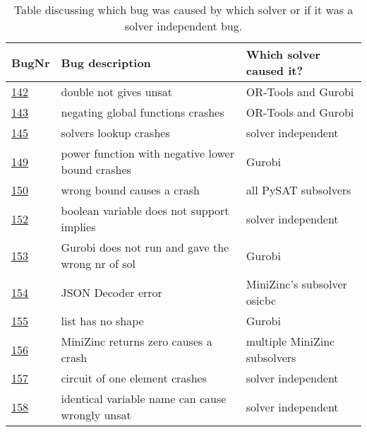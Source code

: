 \begin{table}[]
	\centering
	\caption{Table discussing which bug was caused by which solver or if it was a solver independent bug.}
	\label{tab:bug:Solver}
	\begin{tabular}{lll}
		\hline
		BugNr & Bug description                                           & Which solver caused it?\\ \toprule
		\href{https://github.com/CPMpy/cpmpy/issues/142}{142} & double not gives unsat                            & OR-Tools and Gurobi          \\
		\href{https://github.com/CPMpy/cpmpy/issues/143}{143} & negating global functions crashes                 & OR-Tools and Gurobi          \\
		\href{https://github.com/CPMpy/cpmpy/issues/145}{145} & solvers lookup crashes                            & solver independent           \\
		\href{https://github.com/CPMpy/cpmpy/issues/149}{149} & power function with negative lower bound crashes  & Gurobi                       \\
		\href{https://github.com/CPMpy/cpmpy/issues/150}{150} & wrong bound causes a crash                  & all PySAT subsolvers         \\
		\href{https://github.com/CPMpy/cpmpy/issues/152}{152} & boolean variable does not support implies         & solver independent           \\
		\href{https://github.com/CPMpy/cpmpy/issues/153}{153} & Gurobi does not run and gave the wrong nr of sol  & Gurobi                       \\
		\href{https://github.com/CPMpy/cpmpy/issues/154}{154} & JSON Decoder error                                & MiniZinc's subsolver osicbc  \\
		\href{https://github.com/CPMpy/cpmpy/issues/155}{155} & list has no shape                                 & Gurobi                       \\
		\href{https://github.com/CPMpy/cpmpy/issues/156}{156} & MiniZinc returns zero causes a crash              & multiple MiniZinc subsolvers \\
		\href{https://github.com/CPMpy/cpmpy/issues/157}{157} & circuit of one element crashes                    & solver independent           \\
		\href{https://github.com/CPMpy/cpmpy/issues/158}{158} & identical variable name can cause wrongly unsat   & solver independent           \\

\end{tabular}
\end{table}
